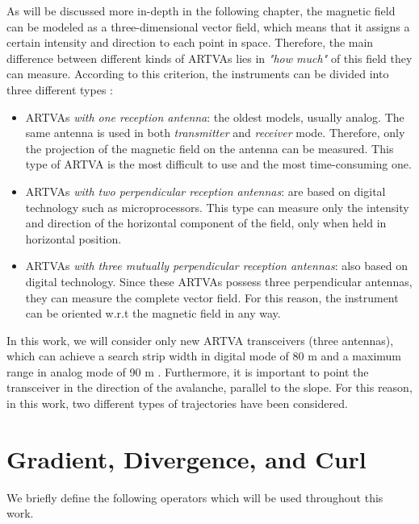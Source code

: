 As will be discussed more in-depth in the following chapter, the magnetic field 
can be modeled as a three-dimensional vector field, which means that it assigns a 
certain intensity and direction to each point in space. Therefore, the main 
difference between different kinds of ARTVAs lies in \textit{"how much"} of this 
field they can measure. According to this criterion, the instruments can be 
divided into three different types \cite{first-model}:

\begin{itemize}
    \item ARTVAs \textit{with one reception antenna}: the oldest models, usually
    analog. The same antenna is used in both \textit{transmitter} and 
    \textit{receiver} mode. Therefore, only the projection of the magnetic field 
    on the antenna can be measured. This type of ARTVA is the most difficult to 
    use and the most time-consuming one.
    
    \item ARTVAs \textit{with two perpendicular reception antennas}: are based on 
    digital technology such as microprocessors. This type can measure only the 
    intensity and direction of the horizontal component of the field, only when 
    held in horizontal position.
    
    \item ARTVAs \textit{with three mutually perpendicular reception antennas}: 
    also based on digital technology. Since these ARTVAs possess three 
    perpendicular antennas, they can measure the complete vector field. For this 
    reason, the instrument can be oriented w.r.t the magnetic field in any way.
\end{itemize}

In this work, we will consider only new ARTVA transceivers (three antennas), 
which can achieve a search strip width in digital mode of 80 m and a maximum 
range in analog mode of 90 m \cite{manual}. Furthermore, it is important to point 
the transceiver in the direction of the avalanche, parallel to the slope. For 
this reason, in this work, two different types of trajectories have been 
considered.

\section{Gradient, Divergence, and Curl} \label{Gradient, Divergence, and Curl}
We briefly define the following operators which will be used throughout this 
work.

